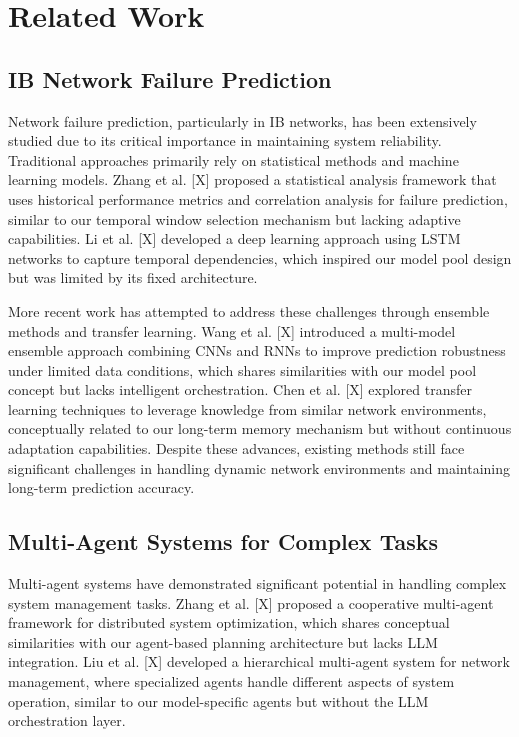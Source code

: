 \documentclass[conference]{IEEEtran}
\begin{document}
\section{Related Work}

\subsection{IB Network Failure Prediction}
Network failure prediction, particularly in IB networks, has been extensively studied due to its critical importance in maintaining system reliability. Traditional approaches primarily rely on statistical methods and machine learning models. Zhang et al. [X] proposed a statistical analysis framework that uses historical performance metrics and correlation analysis for failure prediction, similar to our temporal window selection mechanism but lacking adaptive capabilities. Li et al. [X] developed a deep learning approach using LSTM networks to capture temporal dependencies, which inspired our model pool design but was limited by its fixed architecture.

More recent work has attempted to address these challenges through ensemble methods and transfer learning. Wang et al. [X] introduced a multi-model ensemble approach combining CNNs and RNNs to improve prediction robustness under limited data conditions, which shares similarities with our model pool concept but lacks intelligent orchestration. Chen et al. [X] explored transfer learning techniques to leverage knowledge from similar network environments, conceptually related to our long-term memory mechanism but without continuous adaptation capabilities. Despite these advances, existing methods still face significant challenges in handling dynamic network environments and maintaining long-term prediction accuracy.

\subsection{Multi-Agent Systems for Complex Tasks}
Multi-agent systems have demonstrated significant potential in handling complex system management tasks. Zhang et al. [X] proposed a cooperative multi-agent framework for distributed system optimization, which shares conceptual similarities with our agent-based planning architecture but lacks LLM integration. Liu et al. [X] developed a hierarchical multi-agent system for network management, where specialized agents handle different aspects of system operation, similar to our model-specific agents but without the LLM orchestration layer.
\end{document}
